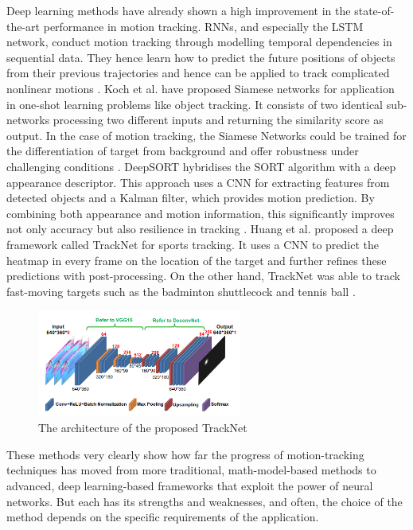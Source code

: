     Deep learning methods have already shown a high improvement in the state-of-the-art performance in motion tracking. RNNs, and especially the LSTM network, conduct motion tracking through modelling temporal dependencies in sequential data. They hence learn how to predict the future positions of objects from their previous trajectories and hence can be applied to track complicated nonlinear motions \citep{hochreiter1997long}. Koch et al. have proposed Siamese networks for application in one-shot learning problems like object tracking. It consists of two identical sub-networks processing two different inputs and returning the similarity score as output. In the case of motion tracking, the Siamese Networks could be trained for the differentiation of target from background and offer robustness under challenging conditions \citep{koch2015siamese}. DeepSORT hybridises the SORT algorithm with a deep appearance descriptor. This approach uses a CNN for extracting features from detected objects and a Kalman filter, which provides motion prediction. By combining both appearance and motion information, this significantly improves not only accuracy but also resilience in tracking \citep{wojke2017simple}. Huang et al. proposed a deep framework called TrackNet for sports tracking. It uses a CNN to predict the heatmap in every frame on the location of the target and further refines these predictions with post-processing. On the other hand, TrackNet was able to track fast-moving targets such as the badminton shuttlecock and tennis ball \citep{huang2019tracknet}. \\

    \begin{figure}[htbp]
        \centering
        \includegraphics[width=0.6\textwidth]{figures/tracknet.png}
        \caption{The architecture of the proposed TrackNet \citep{huang2019tracknet}}
        \label{fig:tracknet}
    \end{figure}

    These methods very clearly show how far the progress of motion-tracking techniques has moved from more traditional, math-model-based methods to advanced, deep learning-based frameworks that exploit the power of neural networks. But each has its strengths and weaknesses, and often, the choice of the method depends on the specific requirements of the application.

